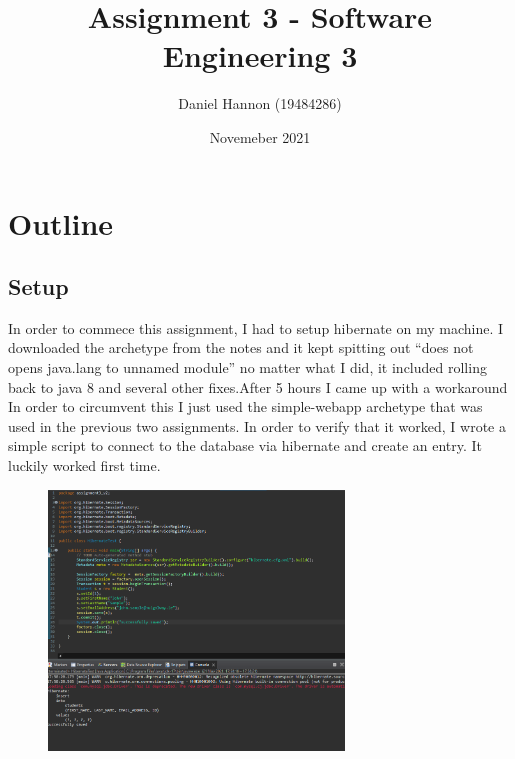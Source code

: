 \documentclass{article}
\title{Assignment 3 - Software Engineering 3}
\author{Daniel Hannon (19484286)}
\date{Novemeber 2021}
\begin{document}
	\maketitle
	\section{Outline}
	\subsection{Setup}
	In order to commece this assignment, I had to setup hibernate on my machine. I downloaded the archetype from the notes and it kept spitting out ``does not opens java.lang to unnamed module'' no matter what I did, it included rolling back to java 8 and several other fixes.After 5 hours I came up with a workaround In order to circumvent this I just used the simple-webapp archetype that was used in the previous two assignments.  In order to verify that it worked, I wrote a simple script to connect to the database via hibernate and create an entry. It luckily worked first time.
	\begin{figure}[h!]
		\centering
		\includegraphics[width=0.7\textwidth]{1.png}
	\end{figure}
\end{document}
